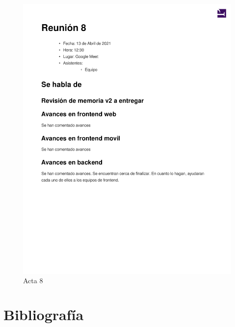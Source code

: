\documentclass{article}
\begin{document}
\begin{figure}
    \includegraphics[width=.8\textwidth]{../../actas_reuniones/acta8.pdf}
    \caption{Acta 8}
\end{figure}

\section*{Bibliografía}
\end{document}
